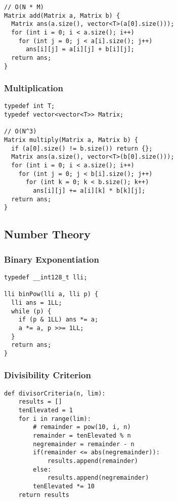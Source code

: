 \documentclass[twoside]{article}
\begin{document}
\begin{multicols*}{2}
\begin{verbatim}
// O(N * M)
Matrix add(Matrix a, Matrix b) {
  Matrix ans(a.size(), vector<T>(a[0].size()));
  for (int i = 0; i < a.size(); i++)
    for (int j = 0; j < a[i].size(); j++)
      ans[i][j] = a[i][j] + b[i][j];
  return ans;
}
\end{verbatim}

\subsubsectionfont{\large\bfseries\sffamily\underline}
\subsubsection*{Multiplication}
\begin{verbatim}
typedef int T;
typedef vector<vector<T>> Matrix;

// O(N^3)
Matrix multiply(Matrix a, Matrix b) {
  if (a[0].size() != b.size()) return {};
  Matrix ans(a.size(), vector<T>(b[0].size()));
  for (int i = 0; i < a.size(); i++)
    for (int j = 0; j < b[i].size(); j++)
      for (int k = 0; k < b.size(); k++)
        ans[i][j] += a[i][k] * b[k][j];
  return ans;
}
\end{verbatim}

\subsectionfont{\bfseries\sffamily\centering\LARGE}
\vspace{0em}
\subsection*{Number Theory}
\vspace{2em}
\subsubsectionfont{\large\bfseries\sffamily\underline}
\subsubsection*{Binary Exponentiation}
\begin{verbatim}
typedef __int128_t lli;

lli binPow(lli a, lli p) {
  lli ans = 1LL;
  while (p) {
    if (p & 1LL) ans *= a;
    a *= a, p >>= 1LL;
  }
  return ans;
}
\end{verbatim}

\subsubsectionfont{\large\bfseries\sffamily\underline}
\subsubsection*{Divisibility Criterion}
\begin{verbatim}
def divisorCriteria(n, lim):
    results = []
    tenElevated = 1
    for i in range(lim):
        # remainder = pow(10, i, n)
        remainder = tenElevated % n
        negremainder = remainder - n
        if(remainder <= abs(negremainder)):
            results.append(remainder)
        else:
            results.append(negremainder)
        tenElevated *= 10
    return results



\end{verbatim}
\end{multicols*}
\end{document}
